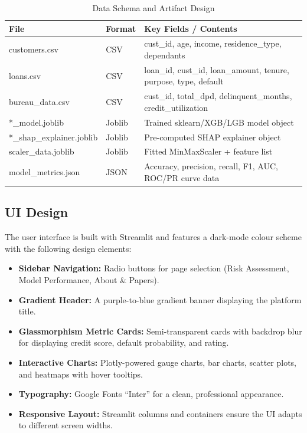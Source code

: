 \documentclass[12pt,a4paper]{report}
\begin{document}
\begin{table}[H]
\centering
\caption{Data Schema and Artifact Design}\label{tab:dbdesign}
\begin{tabular}{|l|l|p{7cm}|}
\hline
\rowcolor{headercolor}
\color{white}\textbf{File} & \color{white}\textbf{Format} & \color{white}\textbf{Key Fields / Contents} \\
\hline
customers.csv & CSV & cust\_id, age, income, residence\_type, dependants \\
\hline
loans.csv & CSV & loan\_id, cust\_id, loan\_amount, tenure, purpose, type, default \\
\hline
bureau\_data.csv & CSV & cust\_id, total\_dpd, delinquent\_months, credit\_utilization \\
\hline
*\_model.joblib & Joblib & Trained sklearn/XGB/LGB model object \\
\hline
*\_shap\_explainer.joblib & Joblib & Pre-computed SHAP explainer object \\
\hline
scaler\_data.joblib & Joblib & Fitted MinMaxScaler + feature list \\
\hline
model\_metrics.json & JSON & Accuracy, precision, recall, F1, AUC, ROC/PR curve data \\
\hline
\end{tabular}
\end{table}

\subsection{UI Design}

The user interface is built with Streamlit and features a dark-mode colour scheme with the following design elements:

\begin{itemize}
    \item \textbf{Sidebar Navigation:} Radio buttons for page selection (Risk Assessment, Model Performance, About \& Papers).
    \item \textbf{Gradient Header:} A purple-to-blue gradient banner displaying the platform title.
    \item \textbf{Glassmorphism Metric Cards:} Semi-transparent cards with backdrop blur for displaying credit score, default probability, and rating.
    \item \textbf{Interactive Charts:} Plotly-powered gauge charts, bar charts, scatter plots, and heatmaps with hover tooltips.
    \item \textbf{Typography:} Google Fonts ``Inter'' for a clean, professional appearance.
    \item \textbf{Responsive Layout:} Streamlit columns and containers ensure the UI adapts to different screen widths.
\end{itemize}
\end{document}
